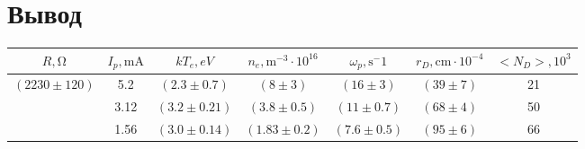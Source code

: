 \documentclass[12pt]{article}
\begin{document}
\section{Вывод}

\begin{tabular}{|c|c|c|c|c|c|c|}
\hline
     $R, \si{\ohm}$ & $I_p, \si{\milli \ampere}$ & $kT_e, eV$ & $n_e, \si{\metre}^{-3}  \cdot 10^{16}$ &
     $\omega_p, \si{\second}^-1$ & $r_D, \si{\centi \metre} \cdot 10^{-4}$ & $<N_D>, 10^3$ \\ \hline
     $(2230 \pm 120)$ & 5.2 & $(2.3 \pm 0.7)$ & $(8 \pm 3)$ & $(16 \pm 3)$ & $(39 \pm 7)$ & 21 \\ \hline
      & 3.12 & $(3.2 \pm 0.21)$ & $(3.8 \pm 0.5)$ & $(11 \pm 0.7)$ & $(68 \pm 4)$ & 50 \\ \hline
      & 1.56 & $(3.0 \pm 0.14)$ & $(1.83 \pm 0.2)$ & $(7.6 \pm 0.5)$ & $(95 \pm 6)$ & 66 \\ \hline
\end{tabular}
\end{document}
